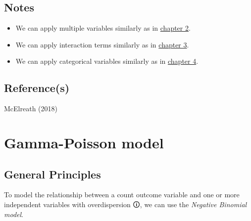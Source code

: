 \documentclass[
  letterpaper,
  DIV=11,
  numbers=noendperiod]{scrreprt}
\begin{document}
\section{Notes}\label{notes-2}

\begin{tcolorbox}[enhanced jigsaw, toptitle=1mm, opacityback=0, titlerule=0mm, breakable, bottomrule=.15mm, colframe=quarto-callout-note-color-frame, arc=.35mm, coltitle=black, left=2mm, opacitybacktitle=0.6, leftrule=.75mm, toprule=.15mm, rightrule=.15mm, bottomtitle=1mm, colbacktitle=quarto-callout-note-color!10!white, title=\textcolor{quarto-callout-note-color}{\faInfo}\hspace{0.5em}{Note}, colback=white]

\begin{itemize}
\item
  We can apply multiple variables similarly as in
  \href{2.\%20Multiple\%20Regression\%20for\%20Continuous\%20Variables.qmd}{chapter
  2}.
\item
  We can apply interaction terms similarly as in
  \href{3.\%20Interaction\%20between\%20continuous\%20variables.qmd}{chapter
  3}.
\item
  We can apply categorical variables similarly as in
  \href{4.\%20Categorical\%20variable.md}{chapter 4}.
\end{itemize}

\end{tcolorbox}

\section{Reference(s)}\label{references-6}

McElreath (2018)


\chapter{Gamma-Poisson model}\label{gamma-poisson-model}

\section{General Principles}\label{general-principles-7}

To model the relationship between a count outcome variable and one or
more independent variables with
\label{overdispersion}{{overdispersion 🛈}}, we can use
the \emph{Negative Binomial model}.
\end{document}
